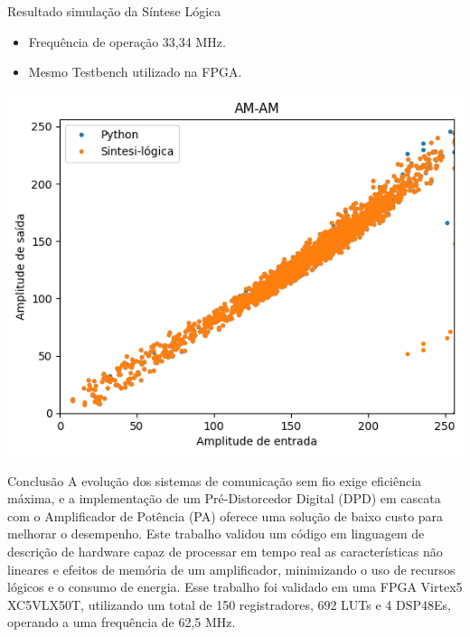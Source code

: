 \documentclass{if-beamer}
\begin{document}
\begin{frame}{Resultado simulação da Síntese Lógica}
	\begin{minipage}{0.5\textwidth}
		\begin{itemize}
			\item Frequência de operação 33,34 MHz.
			\item Mesmo Testbench utilizado na FPGA.
		\end{itemize}
		
	\end{minipage}%
	\hspace{0.04\textwidth}
	\begin{minipage}{0.5\textwidth}
		\includegraphics[scale=0.40]{simpossin.png}
	\end{minipage}
\end{frame}

\begin{frame}{Conclusão}
	A evolução dos sistemas de comunicação sem fio exige eficiência máxima, e a implementação de um Pré-Distorcedor Digital (DPD) em cascata com o Amplificador de Potência (PA) oferece uma solução de baixo custo para melhorar o desempenho. Este trabalho validou um código em linguagem de descrição de hardware capaz de processar em tempo real as características não lineares e efeitos de memória de um amplificador, minimizando o uso de recursos lógicos e o consumo de energia. Esse trabalho foi validado em uma  FPGA Virtex5 XC5VLX50T, utilizando um total de 150 registradores, 692 LUTs e 4 DSP48Es, operando a uma frequência de 62,5 MHz.  
\end{frame}
\end{document}
